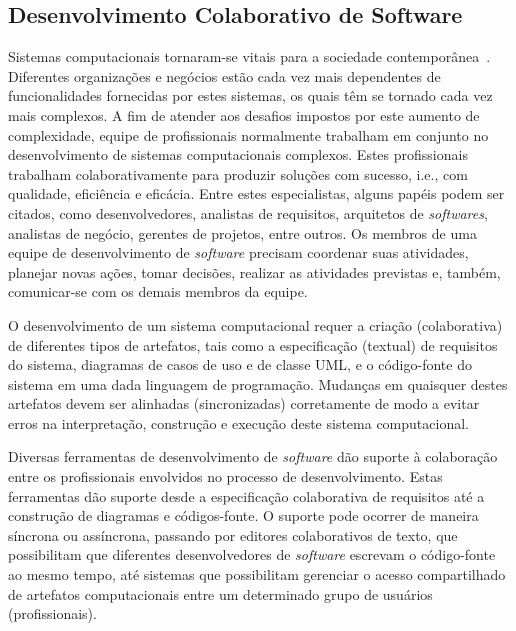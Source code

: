\subsection{Desenvolvimento Colaborativo de Software}\label{2-fundamentacao-sistemas-colaborativos-desenvolvimento}

Sistemas computacionais tornaram-se vitais para a sociedade contemporânea~\cite{SOUZA-MARCZAK-PRIKLANDNICKI-2012-Desenvolvimento-Colaborativo-Software}. Diferentes organizações e negócios estão cada vez mais dependentes de funcionalidades fornecidas por estes sistemas, os quais têm se tornado cada vez mais complexos. A fim de atender aos desafios impostos por este aumento de complexidade, equipe de profissionais normalmente trabalham em conjunto no desenvolvimento de sistemas computacionais complexos. Estes profissionais trabalham colaborativamente para produzir soluções com sucesso, i.e., com qualidade, eficiência e eficácia. Entre estes especialistas, alguns papéis podem ser citados, como desenvolvedores, analistas de requisitos, arquitetos de \textit{softwares}, analistas de negócio, gerentes de projetos, entre outros. Os membros de uma equipe de desenvolvimento de \textit{software} precisam coordenar suas atividades, planejar novas ações, tomar decisões, realizar as atividades previstas e, também, comunicar-se com os demais membros da equipe.

O desenvolvimento de um sistema computacional requer a criação (colaborativa) de diferentes tipos de artefatos, tais como a especificação (textual) de requisitos do sistema, diagramas de casos de uso e de classe UML, e o código-fonte do sistema em uma dada linguagem de programação. Mudanças em quaisquer destes artefatos devem ser alinhadas (sincronizadas) corretamente de modo a evitar erros na interpretação, construção e execução deste sistema computacional.

Diversas ferramentas de desenvolvimento de \textit{software} dão suporte à colaboração entre os profissionais envolvidos no processo de desenvolvimento. Estas ferramentas dão suporte desde a especificação colaborativa de requisitos até a construção de diagramas e códigos-fonte. O suporte pode ocorrer de maneira síncrona ou assíncrona, passando por editores colaborativos de texto, que possibilitam que diferentes desenvolvedores de \textit{software} escrevam o código-fonte ao mesmo tempo, até sistemas que possibilitam gerenciar o acesso compartilhado de artefatos computacionais entre um determinado grupo de usuários (profissionais).

